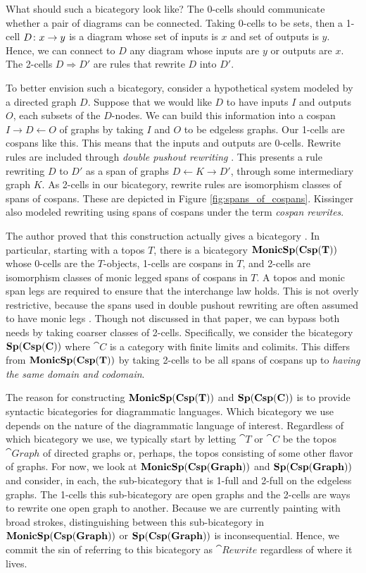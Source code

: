 What should such a bicategory look like? 
The 0-cells should 
communicate whether a pair of diagrams
can be connected.
Taking 0-cells to be sets, 
then a 1-cell $D \colon x \to y$ is 
a diagram whose set of inputs is $x$ 
and set of outputs is $y$. 
Hence, we can connect to $D$ any
diagram whose inputs are $y$ or 
outputs are $x$.  
The 2-cells $D \Rightarrow D'$ are 
rules that rewrite $D$ into $D'$.  

To better envision such a bicategory, 
consider a hypothetical system
modeled by a directed graph $D$. 
Suppose that we would like $D$ 
to have inputs $I$ and outputs $O$, 
each subsets of the $D$-nodes.  
We can build this information 
into a cospan $I \to D \gets O$
of graphs by taking $I$ and $O$ 
to be edgeless graphs.  
Our 1-cells are cospans like this.  
This means that the 
inputs and outputs are $0$-cells.
Rewrite rules are included 
through \emph{double pushout rewriting}
	\cite{Corradini_AlgApprGraphTrans}. 
This presents a rule rewriting $D$ to $D'$ as 
a span of graphs 
$D \gets K \to D'$, 
through some intermediary graph $K$. 
As 2-cells in our bicategory, rewrite rules
are isomorphism classes of spans of cospans. 
These are depicted in Figure \ref{fig:spans_of_cospans}.  
Kissinger
	\cite{Kissinger_Pictures}
also modeled rewriting using spans of cospans
under the term \emph{cospan rewrites}.	 

The author proved that 
this construction
actually gives a bicategory
	\cite{Cicala_SpansCospans}.  
In particular, 
starting with a topos $T$, there is a 
bicategory $\mathbf{MonicSp(Csp(T))}$ whose 
0-cells are the $T$-objects, 
1-cells are cospans in $T$, and
2-cells are isomorphism classes of 
monic legged spans of cospans in $T$.
A topos and monic span legs are required to
ensure that the interchange law holds. 
This is not overly restrictive,
because the spans used in 
double pushout rewriting are
often assumed to have 
monic legs \cite{Habel}.
Though not discussed in that paper, 
we can bypass both needs 
by taking coarser classes of 2-cells. 
Specifically, we consider the bicategory 
$\mathbf{Sp(Csp(C))}$ 
where $\cat{C}$ is a category with 
finite limits and colimits. 
This differs from $\mathbf{MonicSp(Csp(T))}$ by 
taking 2-cells to be all spans of cospans
up to \emph{having the same domain and codomain}.

The reason for constructing
$\mathbf{MonicSp(Csp(T))}$ and $\mathbf{Sp(Csp(C))}$ 
is to provide syntactic bicategories for 
diagrammatic languages. 
Which bicategory we use depends
on the nature of the diagrammatic
language of interest.
Regardless of which bicategory we use,
we typically start by letting
$\cat{T}$ or $\cat{C}$ be the 
topos $\cat{Graph}$ of directed graphs
or, perhaps, the topos consisting
of some other flavor of graphs. 
For now, we look at 
$\mathbf{MonicSp(Csp(Graph))}$ and $\mathbf{Sp(Csp(Graph))}$
and consider, in each,
the sub-bicategory 
that is 1-full and 2-full 
on the edgeless graphs.  
The 1-cells this sub-bicategory are open graphs 
and the 2-cells are ways to rewrite 
one open graph to another.  
Because we are currently painting with broad strokes,
distinguishing between this sub-bicategory in
$\mathbf{MonicSp(Csp(Graph))}$ or $\mathbf{Sp(Csp(Graph))}$
is inconsequential.
Hence, we commit the sin of
referring to this bicategory as $\cat{Rewrite}$
regardless of where it lives.


